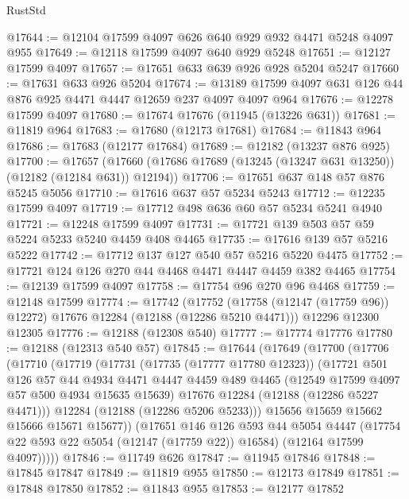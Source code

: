 \begin{lexlean}{RustStd}
\begin{coremodule}
@17644 := @12104 @17599 @4097 @626 @640 @929 @932 @4471 @5248 @4097 @955
@17649 := @12118 @17599 @4097 @640 @929 @5248
@17651 := @12127 @17599 @4097
@17657 := @17651 @633 @639 @926 @928 @5204 @5247
@17660 := @17631 @633 @926 @5204
@17674 := @13189 @17599 @4097 @631 @126 @44 @876 @925 @4471 @4447 @12659 @237 @4097 @4097 @964
@17676 := @12278 @17599 @4097
@17680 := @17674 @17676 (@11945 (@13226 @631))
@17681 := @11819 @964
@17683 := @17680 (@12173 @17681)
@17684 := @11843 @964
@17686 := @17683 (@12177 @17684)
@17689 := @12182 (@13237 @876 @925)
@17700 := @17657
    (@17660 (@17686 @17689 (@13245 (@13247 @631 @13250)) (@12182 (@12184 @631)) @12194))
@17706 := @17651 @637 @148 @57 @876 @5245 @5056
@17710 := @17616 @637 @57 @5234 @5243
@17712 := @12235 @17599 @4097
@17719 := @17712 @498 @636 @60 @57 @5234 @5241 @4940
@17721 := @12248 @17599 @4097
@17731 := @17721 @139 @503 @57 @59 @5224 @5233 @5240 @4459 @408 @4465
@17735 := @17616 @139 @57 @5216 @5222
@17742 := @17712 @137 @127 @540 @57 @5216 @5220 @4475
@17752 := @17721 @124 @126 @270 @44 @4468 @4471 @4447 @4459 @382 @4465
@17754 := @12139 @17599 @4097
@17758 := @17754 @96 @270 @96 @4468
@17759 := @12148 @17599
@17774 := @17742
    (@17752 (@17758 (@12147 (@17759 @96)) @12272) @17676 @12284 (@12188 (@12286 @5210 @4471)))
    @12296
    @12300
    @12305
@17776 := @12188 (@12308 @540)
@17777 := @17774 @17776
@17780 := @12188 (@12313 @540 @57)
@17845 := @17644
    (@17649
      (@17700
        (@17706
          (@17710
            (@17719
              (@17731
                (@17735 (@17777 @17780 @12323))
                (@17721
                  @501
                  @126
                  @57
                  @44
                  @4934
                  @4471
                  @4447
                  @4459
                  @489
                  @4465
                  (@12549 @17599 @4097 @57 @500 @4934 @15635 @15639)
                  @17676
                  @12284
                  (@12188 (@12286 @5227 @4471)))
                @12284
                (@12188 (@12286 @5206 @5233)))
              @15656
              @15659
              @15662
              @15666
              @15671
              @15677))
          (@17651
            @146
            @126
            @593
            @44
            @5054
            @4447
            (@17754 @22 @593 @22 @5054 (@12147 (@17759 @22)) @16584)
            (@12164 @17599 @4097)))))
@17846 := @11749 @626
@17847 := @11945 @17846
@17848 := @17845 @17847
@17849 := @11819 @955
@17850 := @12173 @17849
@17851 := @17848 @17850
@17852 := @11843 @955
@17853 := @12177 @17852

\end{coremodule}
\end{lexlean}
